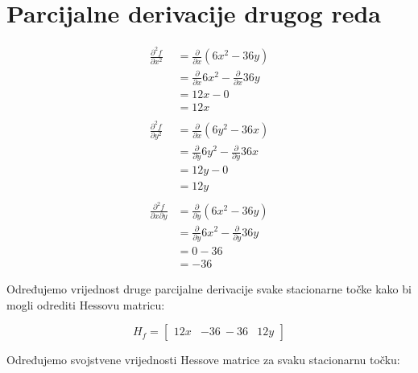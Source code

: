 \section{Parcijalne derivacije drugog reda}

\begin{align*}
    \frac{\partial^2 f}{\partial x^2} & = \frac{\partial}{\partial x} (6x^2 - 36y)\\
    & = \frac{\partial}{\partial x} 6x^2 - \frac{\partial}{\partial x} 36y\\
    & = 12x - 0\\
    & = 12x\\
    \\
    \frac{\partial^2 f}{\partial y^2} & = \frac{\partial}{\partial x} (6y^2 - 36x)\\
    & = \frac{\partial}{\partial y} 6y^2 - \frac{\partial}{\partial y} 36x\\
    & = 12y - 0\\
    & = 12y\\
    \\
    \frac{\partial^2 f}{\partial x \partial y} & = \frac{\partial}{\partial y} (6x^2 - 36y) \\
    & = \frac{\partial}{\partial y} 6x^2 - \frac{\partial}{\partial y} 36y \\
    & = 0 - 36 \\
    & = -36
\end{align*}

Određujemo vrijednost druge parcijalne derivacije svake stacionarne točke kako bi mogli odrediti Hessovu matricu:

$$H_f = \begin{bmatrix} 12x & -36 \ -36 & 12y \end{bmatrix}$$

Određujemo svojstvene vrijednosti Hessove matrice za svaku stacionarnu točku:



\newpage